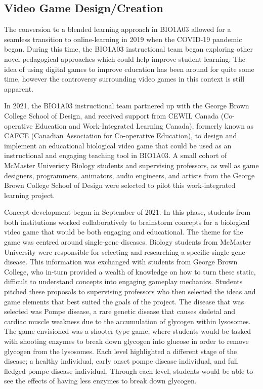 \documentclass[10pt]{article}
\begin{document}
\subsection{Video Game Design/Creation}

The conversion to a blended learning approach in BIO1A03 allowed for a seamless transition to online-learning in 2019 when the COVID-19 pandemic began. During this time, the BIO1A03 instructional team began exploring other novel pedagogical approaches which could help improve student learning. The idea of using digital games to improve education has been around for quite some time, however the controversy surrounding video games in this context is still apparent.

In 2021, the BIO1A03 instructional team partnered up with the George Brown College School of Design, and received support from CEWIL Canada (Co-operative Education and Work-Integrated Learning Canada), formerly known as CAFCE (Canadian Association for Co-operative Education), to design and implement an educational biological video game that could be used as an instructional and engaging teaching tool in BIO1A03. A small cohort of McMaster Univeristy Biology students and supervising professors, as well as game designers, programmers, animators, audio engineers, and artists from the George Brown College School of Design were selected to pilot this work-integrated learning project.

Concept development began in September of 2021. In this phase, students from both institutions worked collaboratively to brainstorm concepts for a biological video game that would be both engaging and educational. The theme for the game was centred around single-gene diseases. Biology students from McMaster University were responsible for selecting and researching a specific single-gene disease. This information was exchanged with students from George Brown College, who in-turn provided a wealth of knowledge on how to turn these static, difficult to understand concepts into engaging gameplay mechanics. Students pitched these proposals to supervising professors who then selected the ideas and game elements that best suited the goals of the project. The disease that was selected was Pompe disease, a rare genetic disease that causes skeletal and cardiac muscle weakness due to the accumulation of glycogen within lysosomes. The game envisioned was a shooter type game, where students would be tasked with shooting enzymes to break down glycogen into glucose in order to remove glycogen from the lysosomes. Each level highlighted a different stage of the disease; a healthy individual, early onset pompe disease individual, and full fledged pompe disease individual. Through each level, students would be able to see the effects of having less enzymes to break down glycogen.
\end{document}
